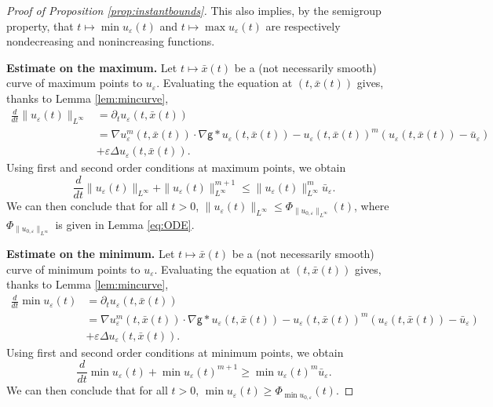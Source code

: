 \documentclass[11pt]{article}
\numberwithin{equation}{section} %
\newcommand{\p}{{\partial}}
\newcommand{\g}{{\mathsf{g}}}
\newcommand{\D}{\Delta}
\newcommand{\ep}{\varepsilon}
\def \ep{\varepsilon}
\def\nab{\nabla}
\begin{document}
\begin{proof}[Proof of Proposition \ref{prop:instantbounds}]
    This also implies, by the semigroup property, that $t\mapsto\min u_\ep(t)$ and $t\mapsto \max u_\ep(t)$ are respectively nondecreasing and nonincreasing functions.

\bigbreak
\textbf{Estimate on the maximum.} Let $t\mapsto \bar x(t)$ be a (not necessarily smooth) curve of maximum points to $u_\ep$. Evaluating the equation at $(t,\bar x(t))$ gives, thanks to Lemma \ref{lem:mincurve},
    \begin{align*}
        \frac{d}{dt}\| u_\ep(t)\|_{L^\infty} &= \p_t u_\ep(t,\bar x(t))\\
        &= \nab u_\ep^m(t,\bar x(t))\cdot\nab\g\ast u_\ep(t,\bar x(t)) - u_\ep(t,\bar x(t))^m(u_\ep(t,\bar x(t)) - \bar u_\ep ) \\
        &+\ep \D u_\ep(t,\bar x(t)).
    \end{align*}
    Using first and second order conditions at maximum points, we obtain
    \begin{equation*}
         \frac{d}{dt}\|u_\ep(t)\|_{L^\infty} + \| u_\ep(t)\|_{L^\infty}^{m+1} \le \|u_\ep(t)\|_{L^\infty}^m\bar u_\ep.
    \end{equation*}
    We can then conclude that for all $t>0$, $\|u_\ep(t)\|_{L^\infty} \le \Phi_{\|u_{0,\ep}\|_{L^\infty}}(t)$, where $\Phi_{\|u_{0,\ep}\|_{L^\infty}}$ is given in Lemma \ref{eq:ODE}.
    
\bigbreak
\textbf{Estimate on the minimum.} Let $t\mapsto \bar x(t)$ be a (not necessarily smooth) curve of minimum points to $u_\ep$. Evaluating the equation at $(t,\bar x(t))$ gives, thanks to Lemma \ref{lem:mincurve},
    \begin{align*}
        \frac{d}{dt}\min u_\ep(t) &= \p_t u_\ep(t,\bar x(t))\\
        &= \nab u_\ep^m(t,\bar x(t))\cdot\nab\g\ast u_\ep(t,\bar x(t)) - u_\ep(t,\bar x(t))^m(u_\ep(t,\bar x(t)) - \bar u_\ep) \\
        &+\ep \D u_\ep(t,\bar x(t)).
    \end{align*}
    Using first and second order conditions at minimum points, we obtain
    \begin{equation*}
         \frac{d}{dt}\min u_\ep(t) + \min u_\ep(t)^{m+1} \ge \min u_\ep(t)^m\bar u_\ep.
    \end{equation*}
    We can then conclude that for all $t>0$, $\min u_\ep(t) \ge \Phi_{\min u_{0,\ep}}(t)$.
    

\end{proof}
\end{document}
